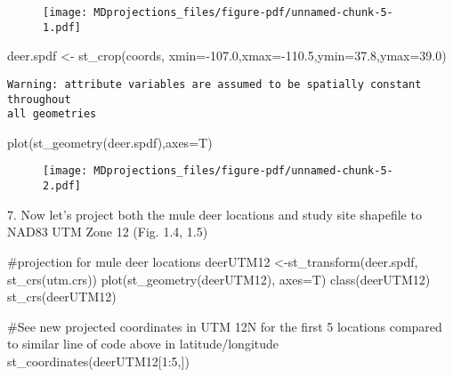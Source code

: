 \documentclass[
  letterpaper,
]{book}
\newenvironment{Shaded}{\begin{snugshade}}{\end{snugshade}}
\newcommand{\AttributeTok}[1]{\textcolor[rgb]{0.40,0.45,0.13}{#1}}
\newcommand{\CommentTok}[1]{\textcolor[rgb]{0.37,0.37,0.37}{#1}}
\newcommand{\DecValTok}[1]{\textcolor[rgb]{0.68,0.00,0.00}{#1}}
\newcommand{\FloatTok}[1]{\textcolor[rgb]{0.68,0.00,0.00}{#1}}
\newcommand{\FunctionTok}[1]{\textcolor[rgb]{0.28,0.35,0.67}{#1}}
\newcommand{\NormalTok}[1]{\textcolor[rgb]{0.00,0.23,0.31}{#1}}
\newcommand{\OtherTok}[1]{\textcolor[rgb]{0.00,0.23,0.31}{#1}}
\newcommand{\SpecialCharTok}[1]{\textcolor[rgb]{0.37,0.37,0.37}{#1}}
\begin{document}
\begin{figure}[H]

{\centering \texttt{[image: MDprojections\_files/figure-pdf/unnamed-chunk-5-1.pdf]}

}

\end{figure}

\begin{Shaded}
\begin{Highlighting}[]
\NormalTok{deer.spdf }\OtherTok{\textless{}{-}} \FunctionTok{st\_crop}\NormalTok{(coords, }\AttributeTok{xmin=}\SpecialCharTok{{-}}\FloatTok{107.0}\NormalTok{,}\AttributeTok{xmax=}\SpecialCharTok{{-}}\FloatTok{110.5}\NormalTok{,}\AttributeTok{ymin=}\FloatTok{37.8}\NormalTok{,}\AttributeTok{ymax=}\FloatTok{39.0}\NormalTok{)}
\end{Highlighting}
\end{Shaded}

\begin{verbatim}
Warning: attribute variables are assumed to be spatially constant throughout
all geometries
\end{verbatim}

\begin{Shaded}
\begin{Highlighting}[]
\FunctionTok{plot}\NormalTok{(}\FunctionTok{st\_geometry}\NormalTok{(deer.spdf),}\AttributeTok{axes=}\NormalTok{T)}
\end{Highlighting}
\end{Shaded}

\begin{figure}[H]

{\centering \texttt{[image: MDprojections\_files/figure-pdf/unnamed-chunk-5-2.pdf]}

}

\end{figure}

7. Now let's project both the mule deer locations and study site
shapefile to NAD83 UTM Zone 12 (Fig. 1.4, 1.5)

\begin{Shaded}
\begin{Highlighting}[]
\CommentTok{\#projection for mule deer locations}
\NormalTok{deerUTM12 }\OtherTok{\textless{}{-}}\FunctionTok{st\_transform}\NormalTok{(deer.spdf, }\FunctionTok{st\_crs}\NormalTok{(utm.crs))}
\FunctionTok{plot}\NormalTok{(}\FunctionTok{st\_geometry}\NormalTok{(deerUTM12), }\AttributeTok{axes=}\NormalTok{T)}
\FunctionTok{class}\NormalTok{(deerUTM12)}
\FunctionTok{st\_crs}\NormalTok{(deerUTM12)}

\CommentTok{\#See new projected coordinates in UTM 12N for the first 5 locations compared to similar line of code above in latitude/longitude}
\FunctionTok{st\_coordinates}\NormalTok{(deerUTM12[}\DecValTok{1}\SpecialCharTok{:}\DecValTok{5}\NormalTok{,])}
\end{Highlighting}
\end{Shaded}
\end{document}
